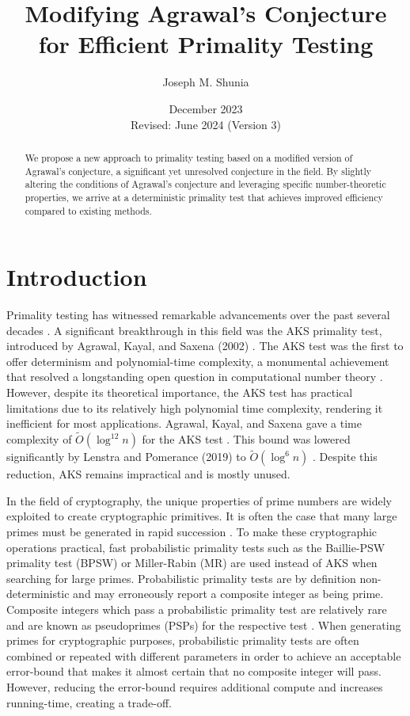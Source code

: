 \documentclass{article}
\title{Modifying Agrawal's Conjecture for Efficient Primality Testing}
\author{Joseph M. Shunia}
\date{December 2023 \\ \small Revised: June 2024 (Version 3) \normalsize}
\theoremstyle{plain}
\theoremstyle{definition}
\begin{document}
\maketitle

\begin{abstract}
We propose a new approach to primality testing based on a modified version of Agrawal's conjecture, a significant yet unresolved conjecture in the field. By slightly altering the conditions of Agrawal's conjecture and leveraging specific number-theoretic properties, we arrive at a deterministic primality test that achieves improved efficiency compared to existing methods.
\end{abstract}

\section{Introduction}
Primality testing has witnessed remarkable advancements over the past several decades \cite{miller1976, baillie1980, rabin1980, wagstaff1982pseudoprimes, aks2002}. A significant breakthrough in this field was the AKS primality test, introduced by Agrawal, Kayal, and Saxena (2002) \cite{aks2002}. The AKS test was the first to offer determinism and polynomial-time complexity, a monumental achievement that resolved a longstanding open question in computational number theory \cite{goldreich2008}. However, despite its theoretical importance, the AKS test has practical limitations due to its relatively high polynomial time complexity, rendering it inefficient for most applications. Agrawal, Kayal, and Saxena gave a time complexity of $\tilde{O}(\log^{12} n)$ for the AKS test \cite{aks2002}. This bound was lowered significantly by Lenstra and Pomerance (2019) to $\tilde{O}(\log^6 n)$ \cite{lenstra2019gaussian}. Despite this reduction, AKS remains impractical and is mostly unused.

In the field of cryptography, the unique properties of prime numbers are widely exploited to create cryptographic primitives. It is often the case that many large primes must be generated in rapid succession \cite{lenstra1987elliptic}. To make these cryptographic operations practical, fast probabilistic primality tests such as the Baillie-PSW primality test (BPSW) \cite{baillie1980} or Miller-Rabin (MR) \cite{miller1976, rabin1980} are used instead of AKS when searching for large primes. Probabilistic primality tests are by definition non-deterministic and may erroneously report a composite integer as being prime. Composite integers which pass a probabilistic primality test are relatively rare and are known as pseudoprimes (PSPs) for the respective test \cite{wagstaff1982pseudoprimes}. When generating primes for cryptographic purposes, probabilistic primality tests are often combined or repeated with different parameters in order to achieve an acceptable error-bound that makes it almost certain that no composite integer will pass. However, reducing the error-bound requires additional compute and increases running-time, creating a trade-off.
\end{document}
